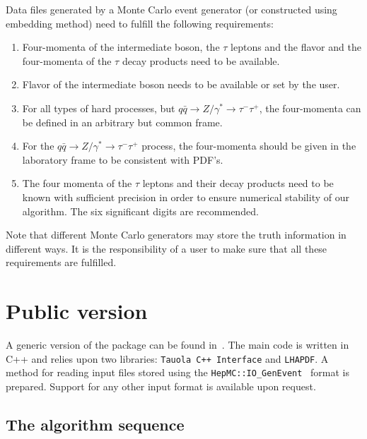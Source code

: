\documentclass[12pt]{article}
\def\Tau{\ensuremath{\tau}\xspace}
\begin{document}
Data files generated by a Monte Carlo event generator (or constructed using embedding method) 
need to fulfill the following requirements: 
\begin{enumerate}
\item Four-momenta of the intermediate boson, the \Tau leptons and the flavor and the four-momenta of the \Tau decay products need to be available.
\item Flavor of the intermediate boson needs to be available or set by the user.
\item For all types of hard processes, but $q\bar{q}\rightarrow Z/\gamma^*\rightarrow\tau^-\tau^+$, the four-momenta can be defined
in an arbitrary but common frame.
\item For the $q\bar{q}\rightarrow Z/\gamma^*\rightarrow\tau^-\tau^+$ process, the four-momenta should be given
in the laboratory frame to be consistent with PDF's.
\item The four momenta of the $\tau$ leptons and their decay products need to be known with sufficient precision in order to
ensure numerical stability of our algorithm. The six significant digits are 
recommended.
\end{enumerate}


Note that different Monte Carlo generators may store the 
truth information in different ways. It is the responsibility of a user to make sure
that all these requirements are fulfilled.


\section{Public version}


A generic version of the package can be found in~\cite{TauSpinnerOfficial}.
The main code is written in C++ and relies upon two libraries:
{\tt Tauola C++ Interface} and {\tt LHAPDF}.
A method for reading input files stored using the {\tt HepMC::IO\_GenEvent}~\cite{Dobbs:2001ck} format is prepared.
Support for any other input format is available upon request.

\subsection{The algorithm sequence}
\end{document}
